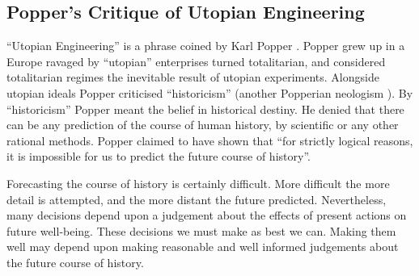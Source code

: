 \subsection{Popper's Critique of Utopian Engineering}

``Utopian Engineering'' is a phrase coined by Karl Popper \cite{popperOSE2}.
Popper grew up in a Europe ravaged by ``utopian'' enterprises turned totalitarian, and considered totalitarian regimes the inevitable result of utopian experiments.
Alongside utopian ideals Popper criticised ``historicism'' (another Popperian neologism \cite{popperPOH}).
By ``historicism'' Popper meant the belief in historical destiny.
He denied that there can be any prediction of the course of human history, by scientific or any other rational methods.
Popper claimed to have shown that ``for strictly logical reasons, it is impossible for us to predict the future course of history''.

Forecasting the course of history is certainly difficult.
More difficult the more detail is attempted, and the more distant the future predicted.
Nevertheless, many decisions depend upon a judgement about the effects of present actions on future well-being.
These decisions we must make as best we can.
Making them well may depend upon making reasonable and well informed judgements about the future course of history.